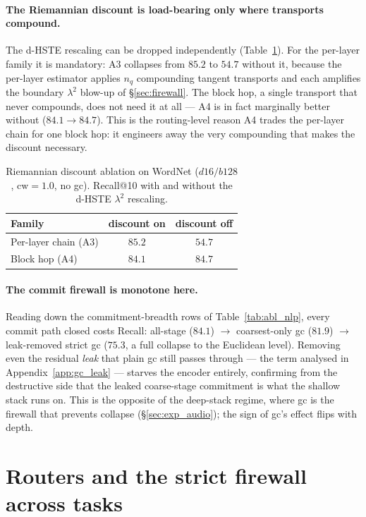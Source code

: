 \documentclass[12pt]{report}
\begin{document}
\paragraph{The Riemannian discount is load-bearing only where transports compound.} The d-HSTE rescaling can be dropped independently (Table~\ref{tab:abl_riem}). For the per-layer family it is mandatory: A3 collapses from $85.2$ to $54.7$ without it, because the per-layer estimator applies $n_q$ compounding tangent transports and each amplifies the boundary $\lambda^2$ blow-up of \S\ref{sec:firewall}. The block hop, a single transport that never compounds, does not need it at all --- A4 is in fact marginally better without ($84.1\!\to\!84.7$). This is the routing-level reason A4 trades the per-layer chain for one block hop: it engineers away the very compounding that makes the discount necessary.

\begin{table}[h]
\centering
\caption{Riemannian discount ablation on WordNet ($d16/b128$, $\text{cw}=1.0$, no gc). Recall@10 with and without the d-HSTE $\lambda^2$ rescaling.}
\label{tab:abl_riem}
\begin{tabular}{lcc}
\hline
Family & discount on & discount off \\
\hline
Per-layer chain (A3) & $85.2$ & $54.7$ \\
Block hop (A4) & $84.1$ & $84.7$ \\
\hline
\end{tabular}
\end{table}

\paragraph{The commit firewall is monotone here.} Reading down the commitment-breadth rows of Table~\ref{tab:abl_nlp}, every commit path closed costs Recall: all-stage ($84.1$) $\to$ coarsest-only gc ($81.9$) $\to$ leak-removed strict gc ($75.3$, a full collapse to the Euclidean level). Removing even the residual \emph{leak} that plain gc still passes through --- the term analysed in Appendix~\ref{app:gc_leak} --- starves the encoder entirely, confirming from the destructive side that the leaked coarse-stage commitment is what the shallow stack runs on. This is the opposite of the deep-stack regime, where gc is the firewall that prevents collapse (\S\ref{sec:exp_audio}); the sign of gc's effect flips with depth.

\section{Routers and the strict firewall across tasks}
\label{sec:abl_crosstask}
\end{document}
